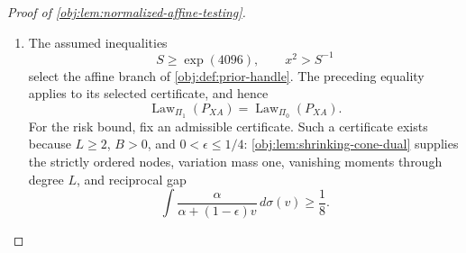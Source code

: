 \documentclass[11pt]{article}
\begin{document}
\begin{proof}[Proof of \cref{obj:lem:normalized-affine-testing}]
\begin{enumerate}
For every \(v\in[0,B]\), the raw arm masses satisfy
\[
\begin{aligned}
S_1(v)+S_0(v)&=b_0+v=w_*(v),\\
S_1(v)-\epsilon w_*(v)&=(1-2\epsilon)v\ge0,\\
(1-\epsilon)w_*(v)-S_1(v)&=(1-2\epsilon)b_0\ge0.
\end{aligned}
\]
Both raw arms are positive. The assigned conditional means belong to \([0,1]\), and summing the raw complete-record table over all atoms gives
\[
p_*+\sum_{j=1}^{K_*}w_*(V_j)=Q.
\]
Division by \(Q\) therefore produces probability tables. Their occupied rare cells satisfy the overlap inequalities above; the reservoir has propensity \(1/2\); and the remaining cells have mass zero. Thus
\[
P_\iota(\boldsymbol\lambda)\in\mathcal M_{d,\epsilon},
\qquad
\iota\in\{0,1\},\quad
\boldsymbol\lambda=((V_j,c_j))_{j=1}^{K_*}\in\Lambda^{K_*},
\]
by \cref{obj:def:model}.

Summing out the outcome coordinate gives, under either hypothesis,
\[
(P_\iota(\boldsymbol\lambda))_{XA}(j,a)=
\begin{cases}
S_a(V_j)/Q,&1\le j\le K_*,\\
p_*/(2Q),&j=K_*+1,\\
0,&j>K_*+1.
\end{cases}
\]
In particular,
\[
(P_1(\boldsymbol\lambda))_{XA}
=(P_0(\boldsymbol\lambda))_{XA}
\quad\text{for every }\boldsymbol\lambda.
\]
Define the common product latent law and its pushforward priors by
\[
\nu_{\mathrm{lat}}=\nu_{\mathrm{cell}}^{\otimes K_*},
\qquad
\Pi_\iota^\sigma=\operatorname{Law}_{\nu_{\mathrm{lat}}}
\bigl(P_\iota(\boldsymbol\lambda)\bigr).
\]
Pushing the pointwise equality through this common latent law yields
\[
\operatorname{Law}_{\Pi_1^\sigma}(P_{XA})
=\operatorname{Law}_{\Pi_0^\sigma}(P_{XA}).
\]

\item
The assumed inequalities
\[
S\ge\exp(4096),\qquad x^2>S^{-1}
\]
select the affine branch of \cref{obj:def:prior-handle}. The preceding equality applies to its selected certificate, and hence
\[
\operatorname{Law}_{\Pi_1}(P_{XA})
=\operatorname{Law}_{\Pi_0}(P_{XA}).
\]
For the risk bound, fix an admissible certificate. Such a certificate exists because \(L\ge2\), \(B>0\), and \(0<\epsilon\le1/4\): \cref{obj:lem:shrinking-cone-dual} supplies the strictly ordered nodes, variation mass one, vanishing moments through degree \(L\), and reciprocal gap
\[
\int\frac{\alpha}{\alpha+(1-\epsilon)v}\,d\sigma(v)\ge\frac18.
\]


\end{enumerate}
\end{proof}
\end{document}
